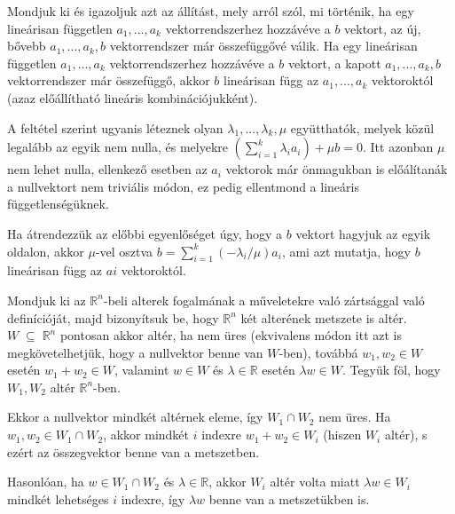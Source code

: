 \begin{frame}
  \begin{tcolorbox}[title={3. (4p)}]
      Mondjuk ki és igazoljuk azt az állítást, mely arról szól, mi történik, ha egy lineárisan független $a_1,...,a_k$ vektorrendszerhez hozzávéve a $b$ vektort, az új, bővebb $a_1,...,a_k,b$ vektorrendszer már összefüggővé válik.
  \tcblower
    Ha egy lineárisan független $a_1,...,a_k$ vektorrendszerhez hozzávéve a $b$ vektort, a kapott $a_1,...,a_k,b$ vektorrendszer már összefüggő, akkor $b$ lineárisan függ az $a_1,...,a_k$ vektoroktól (azaz előállítható lineáris kombinációjukként).\\
    \mmedskip
    
    A feltétel szerint ugyanis léteznek olyan ${\lambda}_1,...,{\lambda}_k,{\mu}$ együtthatók, melyek közül legalább az egyik nem nulla, és melyekre $(\sum_{i = 1}^k {\lambda}_ia_i) + {\mu}b = 0$. Itt azonban ${\mu}$ nem lehet nulla, ellenkező esetben az $a_i$ vektorok már önmagukban is előálítanák a nullvektort nem triviális módon, ez pedig ellentmond a lineáris függetlenségüknek.\\
    \mmedskip
    
    Ha átrendezzük az előbbi egyenlőséget úgy, hogy a $b$ vektort hagyjuk az egyik oldalon, akkor ${\mu}$-vel osztva $b = \sum_{i = 1}^k (-{\lambda}_i/{\mu})a_i$, ami azt mutatja, hogy $b$ lineárisan függ az $ai$ vektoroktól.
  \end{tcolorbox}
\end{frame}

\begin{frame}
  \begin{tcolorbox}[title={4. (4p)}]
      Mondjuk ki az $\mathbb{R}^n$-beli alterek fogalmának a műveletekre való zártsággal való definícióját, majd bizonyítsuk be, hogy $\mathbb{R}^n$ két alterének metszete is altér.
  \tcblower
    $W \; {\subseteq} \; \mathbb{R}^n$ pontosan akkor altér, ha nem üres (ekvivalens módon itt azt is megkövetelhetjük, hogy a nullvektor benne van $W$-ben), továbbá $w_1,w_2 \in W$ esetén $w_1  + w_2 \in W$, valamint $w \in W$ és ${\lambda} \in \mathbb{R}$ esetén ${\lambda}w \in W$. Tegyük föl, hogy $W_1,W_2$ altér $\mathbb{R}^n$-ben.\\
    \mmedskip
    
    Ekkor a nullvektor mindkét altérnek eleme, így $W_1 {\cap}W_2$ nem üres. Ha $w_1,w_2 \in W_1 {\cap}W_2$, akkor mindkét $i$ indexre $w_1 + w_2 \in W_i$ (hiszen $W_i$ altér), s ezért az összegvektor benne van a metszetben.\\
    \mmedskip
    
    Hasonlóan, ha $w \in W_1 {\cap} W_2$ és ${\lambda} \in \mathbb{R}$, akkor $W_i$ altér volta miatt ${\lambda}w \in W_i$ mindkét lehetséges $i$ indexre, így ${\lambda}w$ benne van a metszetükben is.
  \end{tcolorbox}
\end{frame}


